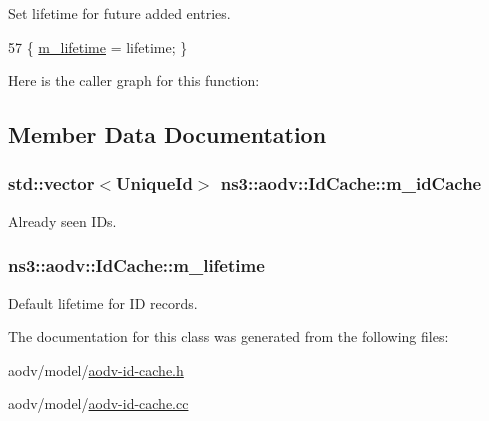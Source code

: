 Set lifetime for future added entries. 


\begin{DoxyCode}
57 \{ \hyperlink{classns3_1_1aodv_1_1IdCache_a3db9763c1c340745d8a1a3101fa96f33}{m\_lifetime} = lifetime; \}
\end{DoxyCode}


Here is the caller graph for this function\+:




\subsection{Member Data Documentation}
\subsubsection[{\texorpdfstring{m\+\_\+id\+Cache}{m_idCache}}]{\setlength{\rightskip}{0pt plus 5cm}std\+::vector$<${\bf Unique\+Id}$>$ ns3\+::aodv\+::\+Id\+Cache\+::m\+\_\+id\+Cache\hspace{0.3cm}{\ttfamily [private]}}\hypertarget{classns3_1_1aodv_1_1IdCache_a1cb7dfd1c4ca8a84035a770f69d9f968}{}\label{classns3_1_1aodv_1_1IdCache_a1cb7dfd1c4ca8a84035a770f69d9f968}


Already seen I\+Ds. 

\subsubsection[{\texorpdfstring{m\+\_\+lifetime}{m_lifetime}}]{ ns3\+::aodv\+::\+Id\+Cache\+::m\+\_\+lifetime\hspace{0.3cm}{\ttfamily [private]}}\hypertarget{classns3_1_1aodv_1_1IdCache_a3db9763c1c340745d8a1a3101fa96f33}{}\label{classns3_1_1aodv_1_1IdCache_a3db9763c1c340745d8a1a3101fa96f33}


Default lifetime for ID records. 



The documentation for this class was generated from the following files\+:\begin{DoxyCompactItemize}
\item 
aodv/model/\hyperlink{aodv-id-cache_8h}{aodv-\/id-\/cache.\+h}\item 
aodv/model/\hyperlink{aodv-id-cache_8cc}{aodv-\/id-\/cache.\+cc}\end{DoxyCompactItemize}
